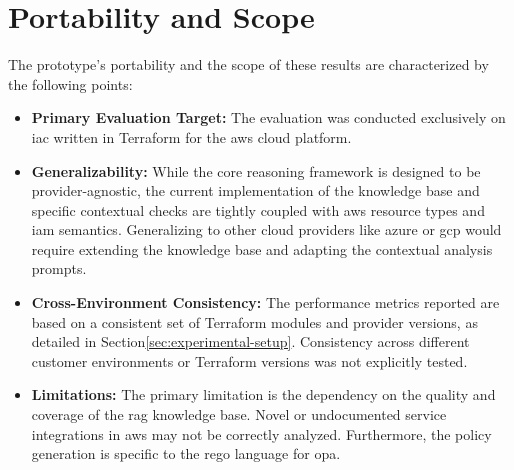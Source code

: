 \section{Portability and Scope}{\label{sec:results-portability}}

The prototype's portability and the scope of these results are characterized by the following points:
\begin{itemize}
    \item \textbf{Primary Evaluation Target:} The evaluation was conducted exclusively on \gls{iac} written in Terraform for the \gls{aws} cloud platform.
    \item \textbf{Generalizability:} While the core reasoning framework is designed to be provider-agnostic, the current implementation of the knowledge base and specific contextual checks are tightly coupled with \gls{aws} resource types and \gls{iam} semantics. Generalizing to other cloud providers like \gls{azure} or \gls{gcp} would require extending the knowledge base and adapting the contextual analysis prompts.
    \item \textbf{Cross-Environment Consistency:} The performance metrics reported are based on a consistent set of Terraform modules and provider versions, as detailed in Section\ref{sec:experimental-setup}. Consistency across different customer environments or Terraform versions was not explicitly tested.
    \item \textbf{Limitations:} The primary limitation is the dependency on the quality and coverage of the \gls{rag} knowledge base. Novel or undocumented service integrations in \gls{aws} may not be correctly analyzed. Furthermore, the policy generation is specific to the \gls{rego} language for \gls{opa}.
\end{itemize}



